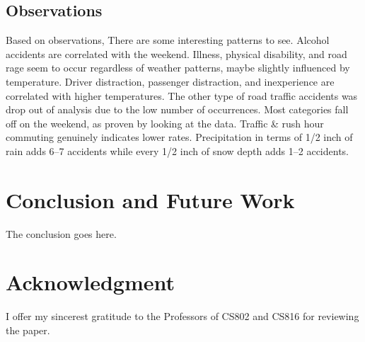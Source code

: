 \documentclass[conference]{IEEEtran}
\begin{document}
\subsection{Observations}
Based on observations, There are some interesting patterns to see. Alcohol accidents are correlated with the weekend. Illness, physical disability, and road rage seem to occur regardless of weather patterns, maybe slightly influenced by temperature. Driver distraction, passenger distraction, and inexperience are correlated with higher temperatures. The other type of road traffic accidents was drop out of analysis due to the low number of occurrences. Most categories fall off on the weekend, as proven by looking at the data. Traffic \& rush hour commuting genuinely indicates lower rates.  Precipitation in terms of 1/2 inch of rain adds 6–7 accidents while every 1/2 inch of snow depth adds 1–2 accidents. 

\section{Conclusion and Future Work}
The conclusion goes here.






\section*{Acknowledgment}
I offer my sincerest gratitude to the Professors of CS802 and CS816 for reviewing the paper.



{\small}
 
\end{document}
